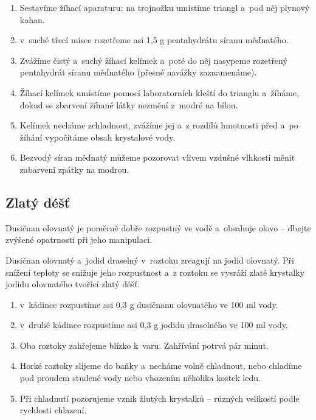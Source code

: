 \hspace{-21px} 

\begin{enumerate}
  \item Sestavíme žíhací aparaturu: na trojnožku umístíme triangl a~pod něj plynový kahan.
  \item v~suché třecí misce rozetřeme asi 1,5 g pentahydrátu síranu měďnatého.
  \item Zvážíme čistý a~suchý žíhací kelímek a~poté do něj nasypeme rozetřený pentahydrát síranu měďnatého (přesné navážky zaznamenáme).
  \item Žíhací kelímek umístíme pomocí laboratorních kleští do trianglu a~žíháme, dokud se zbarvení žíhané látky nezmění z~modré na bílou.
  \item Kelímek necháme zchladnout, zvážíme jej a~z rozdílů hmotnosti před a~po žíhání vypočítáme obsah krystalové vody.
  \item Bezvodý síran měďnatý můžeme pozorovat vlivem vzdušné vlhkosti měnit zabarvení zpátky na modrou.
\end{enumerate}

\subsection{Zlatý déšť}


Dusičnan olovnatý je poměrně dobře rozpustný ve vodě a~obsahuje olovo -- dbejte zvýšené opatrnosti při jeho manipulaci.

\hspace{-21px} 

Dusičnan olovnatý a~jodid draselný v~roztoku zreagují na jodid olovnatý. Při snížení teploty se snižuje jeho rozpustnost a~z roztoku se vysráží zlaté krystalky jodidu olovnatého tvořící zlatý déšť.

\hspace{-21px} 

\begin{enumerate}
  \item v~kádince rozpustíme asi 0,3 g dusičnanu olovnatého ve 100 ml vody.
  \item v~druhé kádince rozpustíme asi 0,3 g jodidu draselného ve 100 ml vody.
  \item Oba roztoky zahřejeme blízko k~varu. Zahřívání potrvá pár minut.
  \item Horké roztoky slijeme do baňky a~necháme volně chladnout, nebo chladíme pod proudem studené vody nebo vhozením několika kostek ledu.
  \item Při chladnutí pozorujeme vznik žlutých krystalků -- různých velikostí podle rychlosti chlazení.
\end{enumerate}

